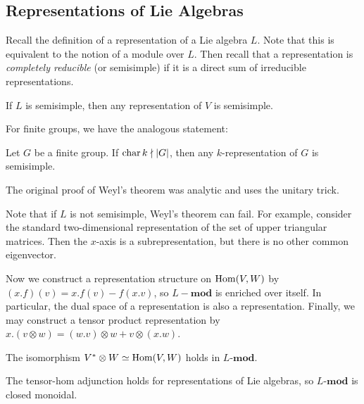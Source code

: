 \documentclass[twoside, 10pt]{article}
\begin{document}
    \subsection{Representations of Lie Algebras}%
    \label{sub:representations_of_lie_algebras}
    
    Recall the definition of a representation of a Lie algebra $L$. Note that this is equivalent to the notion of a module over $L$. Then recall that a representation is \textit{completely reducible} (or semisimple) if it is a direct sum of irreducible representations.

    \begin{thm}[Weyl]
        If $L$ is semisimple, then any representation of $V$ is semisimple.
    \end{thm}
    
    For finite groups, we have the analogous statement:

    \begin{thm}[Maschke]
        Let $G$ be a finite group. If $\operatorname{char} k \nmid \lvert G\rvert$, then any $k$-representation of $G$ is semisimple.
    \end{thm}
    
    \begin{rmk}
        The original proof of Weyl's theorem was analytic and uses the unitary trick.
    \end{rmk}

    Note that if $L$ is not semisimple, Weyl's theorem can fail. For example, consider the standard two-dimensional representation of the set of upper triangular matrices. Then the $x$-axis is a subrepresentation, but there is no other common eigenvector.

    Now we construct a representation structure on $\operatorname{Hom}(V,W)$ by $(x.f)(v) = x.f(v) - f(x.v)$, so $L-\mathbf{mod}$ is enriched over itself. In particular, the dual space of a representation is also a representation. Finally, we may construct a tensor product representation by $x.(v \otimes w) = (w.v)\otimes w + v \otimes (x.w)$.

    \begin{rmk}
        The isomorphism $V^* \otimes W \simeq \operatorname{Hom}(V,W)$ holds in $L$-$\mathbf{mod}$.
    \end{rmk}

    \begin{rmk}
        The tensor-hom adjunction holds for representations of Lie algebras, so $L$-$\mathbf{mod}$ is closed monoidal.
    \end{rmk}
\end{document}
